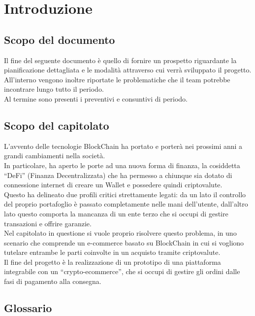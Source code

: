 \section{Introduzione} \label{section:introduzione}

\subsection{Scopo del documento} \label{subsection:intro_scopo_documento}
Il fine del seguente documento è quello di fornire un prospetto riguardante la pianificazione dettagliata e le modalità attraverso cui verrà sviluppato il progetto.\\
All'interno vengono inoltre riportate le problematiche che il team potrebbe incontrare lungo tutto il periodo.\\
Al termine sono presenti i preventivi e consuntivi di periodo.

\subsection{Scopo del capitolato} \label{subsection:intro_scopo_capitolato}
L'avvento delle tecnologie BlockChain\glo{} ha portato e porterà nei prossimi anni a grandi cambiamenti nella società.\\
In particolare, ha aperto le porte ad una nuova forma di finanza, la cosiddetta “DeFi” (Finanza Decentralizzata) che ha permesso a chiunque sia dotato di connessione
 internet di creare un Wallet\glo{} e possedere quindi criptovalute\glo{}.\\
Questo ha delineato due profili critici strettamente legati: da un lato il controllo del proprio portafoglio è passato completamente nelle mani dell'utente, 
dall'altro lato questo comporta la mancanza di un ente terzo che si occupi di gestire transazioni e offrire garanzie.\\
Nel capitolato in questione si vuole proprio risolvere questo problema, in uno scenario che comprende un e-commerce\glo{} basato su BlockChain\glo{} in cui si 
vogliono tutelare entrambe le parti coinvolte in un acquisto tramite criptovalute\glo{}.\\
Il fine del progetto è la realizzazione di un prototipo di una piattaforma integrabile con un “crypto-ecommerce”\glo{}, che si occupi di gestire gli ordini dalle 
fasi di pagamento alla consegna.

\subsection{Glossario} \label{subsection:intro_glossario}
\gloDesc

